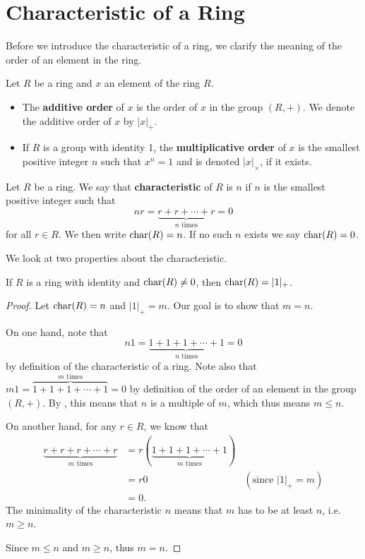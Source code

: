 \section{Characteristic of a Ring}
Before we introduce the characteristic of a ring, we clarify the meaning of the order of an element in the ring.
\begin{definition}
    Let $R$ be a ring and $x$ an element of the ring $R$.
    \begin{itemize}
        \item The \textbf{additive order} of $x$ is the order of $x$ in the group $(R, +)$. We denote the additive order of $x$ by $|x|_+$.
        \item If $R$ is a group with identity 1, the \textbf{multiplicative order} of $x$ is the smallest positive integer $n$ such that $x^n = 1$ and is denoted $|x|_\times$, if it exists.
    \end{itemize}
\end{definition}

\begin{definition}
    Let $R$ be a ring. We say that \textbf{characteristic} of $R$ is $n$ if $n$ is the smallest positive integer such that
    \[
        nr = \underbrace{r+r+\cdots+r}_{n \text{ times}} = 0
    \]
    for all $r \in R$. We then write $\mathrm{char}(R) = n$. If no such $n$ exists we say $\mathrm{char}(R) = 0$.
\end{definition}

We look at two properties about the characteristic.
\begin{proposition}
    If $R$ is a ring with identity and $\mathrm{char}(R) \neq 0$, then $\mathrm{char}(R) = |1|_+$.
\end{proposition}
\begin{proof}
    Let $\mathrm{char}(R) = n$ and $|1|_+ = m$. Our goal is to show that $m = n$.

    On one hand, note that
    \[
        n1 = \underbrace{1+1+1+\cdots+1}_{n \text{ times}} = 0
    \]
    by definition of the characteristic of a ring. Note also that $m1 = \overbrace{1+1+1+\cdots+1}^{m \text{ times}} = 0$ by definition of the order of an element in the group $(R, +)$. By , this means that $n$ is a multiple of $m$, which thus means $m \leq n$.

    On another hand, for any $r \in R$, we know that
    \begin{align*}
        \underbrace{r + r + r + \cdots + r}_{m \text{ times}} &= r(\underbrace{1+1+1+\cdots+1}_{m \text{ times}})\\
        &= r0 & (\text{since } |1|_+ = m)\\
        &= 0.
    \end{align*}
    The minimality of the characteristic $n$ means that $m$ has to be at least $n$, i.e. $m \geq n$.

    Since $m \leq n$ and $m \geq n$, thus $m = n$.
\end{proof}

